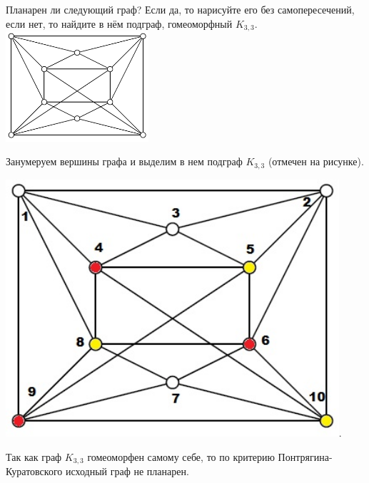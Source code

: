 \begin{task}{66}
Планарен ли следующий граф? Если да, то нарисуйте его без самопересечений, если нет, то найдите в нём подграф, гомеоморфный $K_{3,3}$.
\includegraphics[width = 150pt]{img/id66.png}
\end{task}

\begin{solution}
Занумеруем вершины графа и выделим в нем подграф $K_{3,3}$ (отмечен на рисунке).

\includegraphics[width = 350pt]{img/id66_final.jpg}.

Так как граф $K_{3,3}$ гомеоморфен самому себе, то по критерию Понтрягина-Куратовского исходный граф не планарен.
\end{solution}
